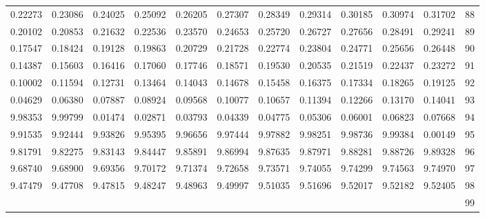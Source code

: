 \begin{center}
\begin{tabular}{|rrrrrrrrrrr|r|}
0.22273&0.23086&0.24025&0.25092&0.26205&0.27307&0.28349&0.29314&0.30185&0.30974&0.31702&88\\
0.20102&0.20853&0.21632&0.22536&0.23570&0.24653&0.25720&0.26727&0.27656&0.28491&0.29241&89\\[5pt]
0.17547&0.18424&0.19128&0.19863&0.20729&0.21728&0.22774&0.23804&0.24771&0.25656&0.26448&90\\
0.14387&0.15603&0.16416&0.17060&0.17746&0.18571&0.19530&0.20535&0.21519&0.22437&0.23272&91\\
0.10002&0.11594&0.12731&0.13464&0.14043&0.14678&0.15458&0.16375&0.17334&0.18265&0.19125&92\\
0.04629&0.06380&0.07887&0.08924&0.09568&0.10077&0.10657&0.11394&0.12266&0.13170&0.14041&93\\
9.98353&9.99799&0.01474&0.02871&0.03793&0.04339&0.04775&0.05306&0.06001&0.06823&0.07668&94\\[5pt]
9.91535&9.92444&9.93826&9.95395&9.96656&9.97444&9.97882&9.98251&9.98736&9.99384&0.00149&95\\
9.81791&9.82275&9.83143&9.84447&9.85891&9.86994&9.87635&9.87971&9.88281&9.88726&9.89328&96\\
9.68740&9.68900&9.69356&9.70172&9.71374&9.72658&9.73571&9.74055&9.74299&9.74563&9.74970&97\\
9.47479&9.47708&9.47815&9.48247&9.48963&9.49997&9.51035&9.51696&9.52017&9.52182&9.52405&98\\
&&&&&&&&&&&99\\
\hline\end{tabular}
\end{center}
